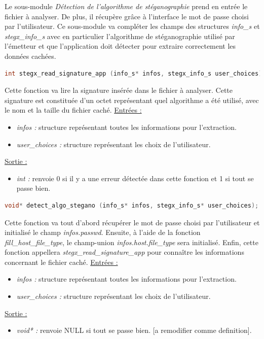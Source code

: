 \documentclass[11pt]{article}
\begin{document}
Le sous-module \textit{Détection de l'algorithme de stéganographie} prend en 
entrée le fichier à analyser. De plus, il récupère grâce à l'interface le 
mot de passe choisi par l'utilisateur.  
Ce sous-module va compléter les champs des structures \textit{info\_s} 
et \textit{stegx\_info\_s} avec en particulier l'algorithme de stéganographie 
utilisé par l'émetteur et que l'application doit détecter pour extraire 
correctement les données cachées. 

\begin{lstlisting}[language=c]
int stegx_read_signature_app (info_s* infos, stegx_info_s user_choices); 
\end{lstlisting}

Cette fonction va lire la signature insérée dans le fichier à analyser. 
Cette signature est constituée d'un octet représentant quel algorithme a 
été utilisé, avec le nom et la taille du fichier caché.  
\newline
\underline{Entrées :} 
\begin{itemize}
\item \textit{infos :} structure représentant toutes les informations pour 
l'extraction.  
\item \textit{user\_choices :} structure représentant les choix de 
l'utilisateur. 
\end{itemize}
\underline{Sortie :} 
\begin{itemize}
\item \textit{int :} renvoie 0 si il y a une erreur détectée dans cette 
fonction et 1 si tout se passe bien.  
\newline 
\end{itemize}

\begin{lstlisting}[language=c]
void* detect_algo_stegano (info_s* infos, stegx_info_s* user_choices); 
\end{lstlisting}

Cette fonction va tout d'abord récupérer le mot de passe choisi par 
l'utilisateur et initialisé le champ \textit{infos.passwd}. Ensuite, à 
l'aide de la fonction \textit{fill\_host\_file\_type}, le champ-union 
\textit{infos.host.file\_type} sera initialisé. Enfin, cette fonction appellera 
\textit{stegx\_read\_signature\_app} pour connaître les informations concernant 
le fichier caché. 
\newline
\underline{Entrées :} 
\begin{itemize}
\item \textit{infos :} structure représentant toutes les informations pour 
l'extraction.  
\item \textit{user\_choices :} structure représentant les choix de 
l'utilisateur. 
\end{itemize}
\underline{Sortie :} 
\begin{itemize}
\item \textit{void* :} renvoie NULL si tout se passe bien. [a remodifier 
comme definition]. 
\newline 
\end{itemize}
\end{document}
